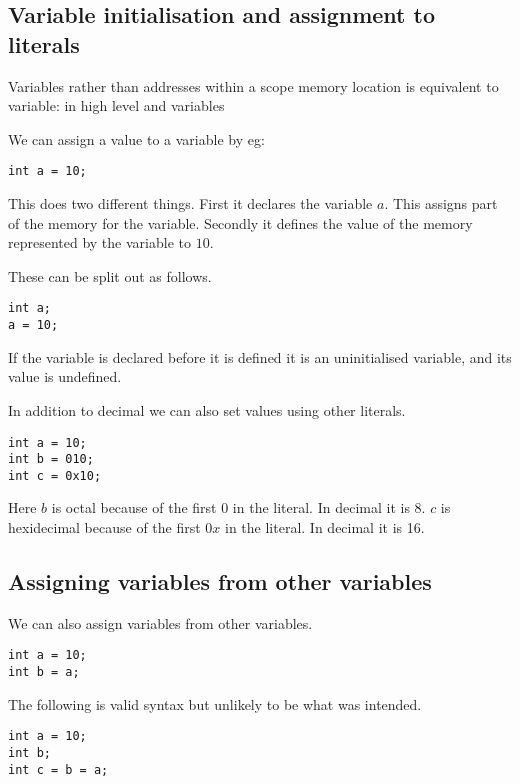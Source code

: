 

\subsection{Variable initialisation and assignment to literals}

Variables rather than addresses
within a scope memory location is equivalent to variable: in high level and variables


We can assign a value to a variable by eg:

\begin{verbatim}
int a = 10;
\end{verbatim}

This does two different things. First it declares the variable \(a\). This assigns part of the memory for the variable.
Secondly it defines the value of the memory represented by the variable to \(10\).

These can be split out as follows.

\begin{verbatim}
int a;
a = 10;
\end{verbatim}

If the variable is declared before it is defined it is an uninitialised variable, and its value is undefined.

In addition to decimal we can also set values using other literals.

\begin{verbatim}
int a = 10;
int b = 010;
int c = 0x10;
\end{verbatim}

Here \(b\) is octal because of the first \(0\) in the literal. In decimal it is 8.
\(c\) is hexidecimal because of the first \(0x\) in the literal. In decimal it is 16.




\subsection{Assigning variables from other variables}

We can also assign variables from other variables.

\begin{verbatim}
int a = 10;
int b = a;
\end{verbatim}

The following is valid syntax but unlikely to be what was intended.
\begin{verbatim}
int a = 10;
int b;
int c = b = a;
\end{verbatim}


